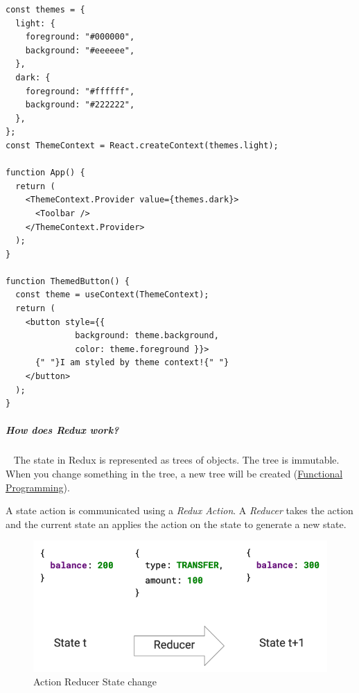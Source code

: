\documentclass[11pt,twoside,landscape]{article}
\begin{document}
\begin{multicols}{3}
\begin{verbatim}
const themes = {
  light: {
    foreground: "#000000",
    background: "#eeeeee",
  },
  dark: {
    foreground: "#ffffff",
    background: "#222222",
  },
};
const ThemeContext = React.createContext(themes.light);

function App() {
  return (
    <ThemeContext.Provider value={themes.dark}>
      <Toolbar />
    </ThemeContext.Provider>
  );
}

function ThemedButton() {
  const theme = useContext(ThemeContext);
  return (
    <button style={{
              background: theme.background,
              color: theme.foreground }}>
      {" "}I am styled by theme context!{" "}
    </button>
  );
}
\end{verbatim}
\subparagraph{How does Redux work?} \
\label{sec:orgfb45ac4}
The state in Redux is represented as trees of objects.
The tree is immutable.
When you change something in the tree, a new tree will be created (\href{../../../roam/20220616080932-functional_programming.org}{Functional Programming}).

A state action is communicated using a \emph{Redux Action}.
A \emph{Reducer} takes the action and the current state an applies the action on the state to generate a new state.

\begin{figure}[htbp]
\centering
\includegraphics[width=.9\linewidth]{img/redux_action_reducer.png}
\caption{\label{fig:action-reducer-state-change}Action Reducer State change}
\end{figure}

\end{multicols}
\end{document}
